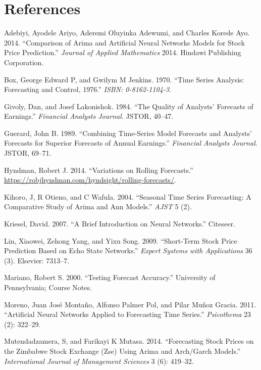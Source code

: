 \documentclass[12pt,a4paper]{article}
\numberwithin{equation}{section}
\numberwithin{figure}{section}
\numberwithin{table}{section}
\begin{document}
\section*{References}\label{references}

\hypertarget{refs}{}
\hypertarget{ref-adebiyi2014comparison}{}
Adebiyi, Ayodele Ariyo, Aderemi Oluyinka Adewumi, and Charles Korede
Ayo. 2014. ``Comparison of Arima and Artificial Neural Networks Models
for Stock Price Prediction.'' \emph{Journal of Applied Mathematics}
2014. Hindawi Publishing Corporation.

\hypertarget{ref-box1970time}{}
Box, George Edward P, and Gwilym M Jenkins. 1970. ``Time Series
Analysis: Forecasting and Control, 1976.'' \emph{ISBN: 0-8162-1104-3}.

\hypertarget{ref-givoly1984quality}{}
Givoly, Dan, and Josef Lakonishok. 1984. ``The Quality of Analysts'
Forecasts of Earnings.'' \emph{Financial Analysts Journal}. JSTOR,
40--47.

\hypertarget{ref-guerard1989combining}{}
Guerard, John B. 1989. ``Combining Time-Series Model Forecasts and
Analysts' Forecasts for Superior Forecasts of Annual Earnings.''
\emph{Financial Analysts Journal}. JSTOR, 69--71.

\hypertarget{ref-RJHyndman2014}{}
Hyndman, Robert J. 2014. ``Variations on Rolling Forecasts.''
\url{https://robjhyndman.com/hyndsight/rolling-forecasts/}.

\hypertarget{ref-kihoro2004seasonal}{}
Kihoro, J, R Otieno, and C Wafula. 2004. ``Seasonal Time Series
Forecasting: A Comparative Study of Arima and Ann Models.'' \emph{AJST}
5 (2).

\hypertarget{ref-kriesel2007brief}{}
Kriesel, David. 2007. ``A Brief Introduction on Neural Networks.''
Citeseer.

\hypertarget{ref-lin2009short}{}
Lin, Xiaowei, Zehong Yang, and Yixu Song. 2009. ``Short-Term Stock Price
Prediction Based on Echo State Networks.'' \emph{Expert Systems with
Applications} 36 (3). Elsevier: 7313--7.

\hypertarget{ref-Mariano2000}{}
Mariano, Robert S. 2000. ``Testing Forecast Accuracy.'' University of
Pennsylvania; Course Notes.

\hypertarget{ref-moreno2011artificial}{}
Moreno, Juan José Montaño, Alfonso Palmer Pol, and Pilar Muñoz Gracia.
2011. ``Artificial Neural Networks Applied to Forecasting Time Series.''
\emph{Psicothema} 23 (2): 322--29.

\hypertarget{ref-Muten2014}{}
Mutendadzamera, S, and Farikayi K Mutasa. 2014. ``Forecasting Stock
Prices on the Zimbabwe Stock Exchange (Zse) Using Arima and Arch/Garch
Models.'' \emph{International Journal of Management Sciences} 3 (6):
419--32.
\end{document}
